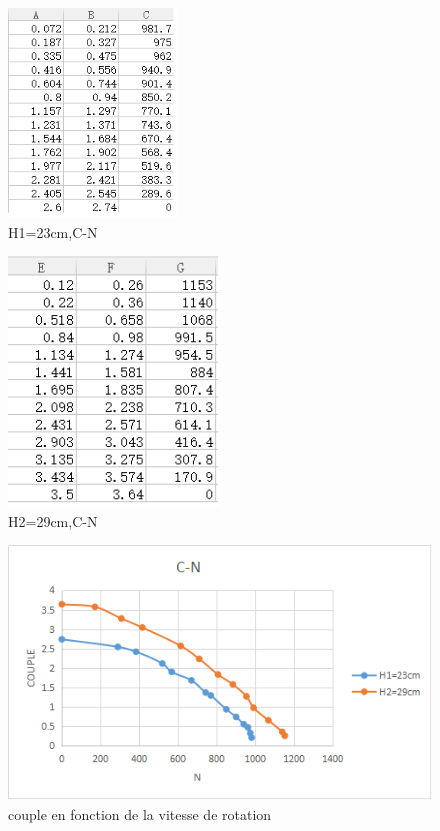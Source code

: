 \documentclass[a4paper,10pt]{report} %
\begin{document}
\begin{figure}[h!]
\centering
\includegraphics[width=0.4\textwidth]{fig/figure4.png}
\caption{H1=23cm,C-N}
\end{figure}
\begin{figure}[h!]
\centering
\includegraphics[width=0.5\textwidth]{fig/figure5.png}
\caption{H2=29cm,C-N}
\end{figure}

\begin{figure}[h!]
\centering
\includegraphics[width=1.0\textwidth]{fig/figure6.png}
\caption{couple en fonction de la vitesse de rotation}
\end{figure}
\end{document}
